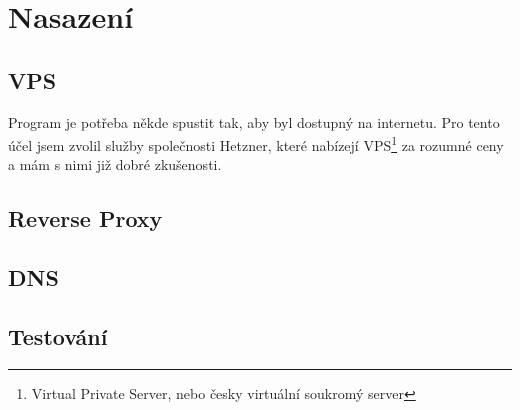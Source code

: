 \hypertarget{Technologie}{\chapter{Nasazení}}

\section{VPS}

Program je potřeba někde spustit tak, aby byl dostupný na internetu. Pro tento účel jsem zvolil služby společnosti Hetzner, které nabízejí VPS\footnote{Virtual Private Server, nebo česky virtuální soukromý server} za rozumné ceny a mám s nimi již dobré zkušenosti. 

\section{Reverse Proxy}

\section{DNS}

\section{Testování}